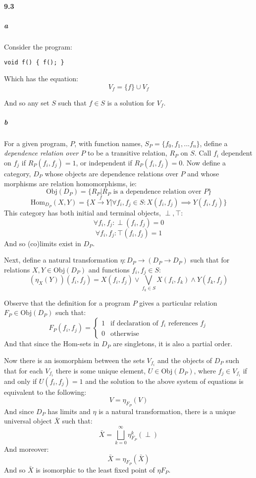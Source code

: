\documentclass{article}
\begin{document}
\paragraph{9.3}

\subparagraph{a}
Consider the program:
\begin{verbatim}
void f() { f(); }
\end{verbatim}

Which has the equation:
\[ V_f = \{ f \} \cup V_f \]

And so any set $S$ such that $f \in S$ is a solution for $V_f$.

\subparagraph{b}
For a given program, $P$, with function names, $S_P = \{ f_0, f_1, ... f_n \}$, define a \emph{dependence relation over $P$} to be a transitive relation, $R_P$ on $S$.  Call $f_i$ dependent on $f_j$ if $R_P(f_i, f_j) = 1$, or independent if $R_P(f_i, f_j) = 0$.  Now define a category, $D_P$ whose objects are dependence relations over $P$ and whose morphisms are relation homomorphisms, ie:
\[ \text{Obj}(D_P) = \{ R_P | R_P \text{ is a dependence relation over } P \} \]
\[ \text{Hom}_{D_P}(X, Y) = \{
	X \stackrel{f}{\to} Y | 
	\forall f_i, f_j \in S : X(f_i, f_j) \implies Y(f_i, f_j)
\} \]
This category has both initial and terminal objects, $\perp, \top$:
\[ \forall f_i, f_j : \perp(f_i, f_j) = 0 \]
\[ \forall f_i, f_j : \top(f_i, f_j) = 1 \]
And so (co)limits exist in $D_P$. 

Next, define a natural transformation $\eta : D_P \to (D_P \to D_P)$ such that for relations $X, Y \in \text{Obj} (D_P)$ and functions $f_i,f_j \in S$:
\[ \left( \eta_X(Y) \right)(f_i, f_j) = X(f_i, f_j) \vee \bigvee \limits_{f_k \in S} X(f_i, f_k) \wedge Y(f_k, f_j) \]

Observe that the definition for a program $P$ gives a particular relation $F_P \in \text{Obj}(D_P)$ such that:
\[ F_P \left( f_i, f_j \right) = \left \{ \begin{array}{cc}
1 & \text{if declaration of }f_i\text{ references } f_j \\
0 & \text{otherwise}
\end{array} \right. \]
And that since the Hom-sets in $D_P$ are singletons, it is also a partial order.

Now there is an isomorphism between the sets $V_{f_i}$ and the objects of $D_P$ such that for each $V_{f_i}$ there is some unique element, $U \in \text{Obj}(D_P)$, where $f_j \in V_{f_i}$ if and only if $U(f_i,f_j) = 1$ and the solution to the above system of equations is equivalent to the following:
\[ V = \eta_{F_P}(V) \]
And since $D_P$ has limits and $\eta$ is a natural transformation, there is a unique universal object $\bar{X}$ such that:
\[ \bar{X} = \bigsqcup \limits_{k=0}^{\infty} \eta_{F_P}^k (\perp) \]
And moreover:
\[ \bar{X} = \eta_{F_P}(\bar{X}) \]
And so $\bar{X}$ is isomorphic to the least fixed point of $\eta{F_P}$.
\end{document}
